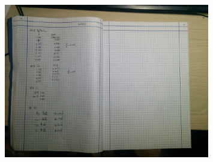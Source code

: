 \documentclass[aps,pre,12pt,preprint,onecolumn,showpacs,showkeys,UTF8]{revtex4-1}
\begin{document}
\begin{figure}[h]
	\begin{center}
		\includegraphics[width=0.8\textwidth]{jiluben4.png}
	\end{center}
\end{figure}
\end{document}
